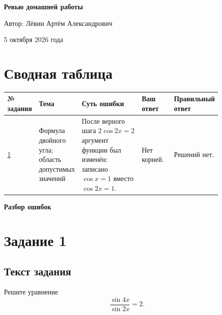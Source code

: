 \documentclass[12pt,a4paper]{article}
\begin{document}
\begin{titlepage}
\centering
\vspace*{0.27\textheight}
{\LARGE\bfseries Ревью домашней работы\par}
\vspace{2.2cm}
{\large Автор: Лёвин Артём Александрович\par}
\vspace{0.7cm}
{\large 5 октября 2026 года\par}
\vfill
{}
\end{titlepage}

\newpage
\section*{Сводная таблица}
\small
\setlength{\tabcolsep}{3pt}
\begin{center}
\begin{tabular}{>{\centering\arraybackslash}p{0.08\linewidth} >{\raggedright\arraybackslash}p{0.20\linewidth} >{\raggedright\arraybackslash}p{0.29\linewidth} >{\raggedright\arraybackslash}p{0.15\linewidth} >{\raggedright\arraybackslash}p{0.15\linewidth}}
\toprule
№ задания & Тема & Суть ошибки & Ваш ответ & Правильный ответ \\
\midrule
\hyperref[task:1]{1} &
Формула двойного угла; область допустимых значений &
После верного шага $2\cos 2x=2$ аргумент функции был изменён: записано $\cos x=1$ вместо $\cos 2x=1$. &
Нет корней. &
Решений нет. \\
\bottomrule
\end{tabular}
\end{center}
\normalsize

\newpage
\vspace*{\fill}
\begin{center}
{\LARGE\bfseries Разбор ошибок}
\end{center}
\vspace*{\fill}
\newpage

\label{task:1}
\section*{Задание 1}

\subsection*{Текст задания}
Решите уравнение
\[
\frac{\sin 4x}{\sin 2x}=2.
\]
\end{document}
